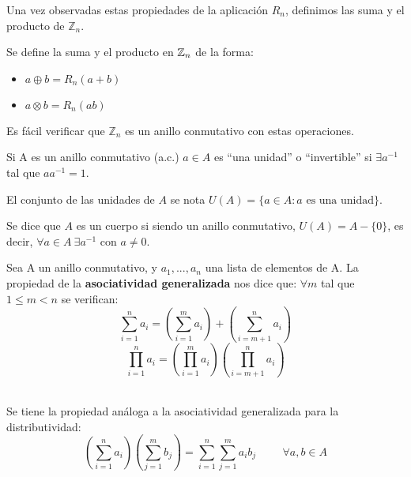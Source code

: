 Una vez observadas estas propiedades de la aplicación $R_n$, definimos las suma y el producto de $\mathbb{Z}_n$.
\begin{ndef} Se define la suma y el producto en $\mathbb{Z}_n$ de la forma:
	\begin{itemize}
	\item $a\oplus b = R_n(a+b)$
	\item $a\otimes b = R_n(ab)$
\end{itemize}

\end{ndef}



Es fácil verificar que $\mathbb{Z}_n$ es un anillo conmutativo con estas operaciones.\\

\begin{ndef}[Unidad]
  Si A es un anillo conmutativo (a.c.) $a \in A$ es ``una unidad'' o ``invertible'' si $\exists a^{-1}$ tal que $ aa^{-1} = 1$.

  El conjunto de las unidades de $A$ se nota $U(A) = \{ a \in A : a \text{ es una unidad} \}$.
\end{ndef}



\begin{ndef}[Cuerpo] Se dice que $A$ es un cuerpo si siendo un anillo conmutativo, $U(A) = A - \{0\}$, es decir, $\forall a \in A \ \exists a^{-1}$  con $a \neq 0$.
\end{ndef}


\begin{nprop}
	Sea A un anillo conmutativo, y $a_1, ..., a_n$ una lista de elementos de A.
La propiedad de la \textbf{asociatividad generalizada} nos dice que:
$\forall m$ tal que $1 \leq m < n$ se verifican: \[\sum_{i=1}^{n}a_i = \left(\sum_{i=1}^{m}a_i\right) + \left(\sum_{i=m+1}^{n}a_i\right)\]\[\prod_{i=1}^{n}a_i = \left(\prod_{i=1}^{m}a_i\right)\left(\prod_{i=m+1}^{n}a_i\right)\]\\
\end{nprop}


\begin{nprop}
Se tiene la propiedad análoga a la asociatividad generalizada para la distributividad:
	\[\left(\sum_{i=1}^{n} a_i\right)\left(\sum_{j=1}^{m}b_j\right) = \sum_{i=1}^{n}\sum_{j=1}^{m}a_i b_j \hspace{1cm} \forall a,b\in A\]
\end{nprop}

